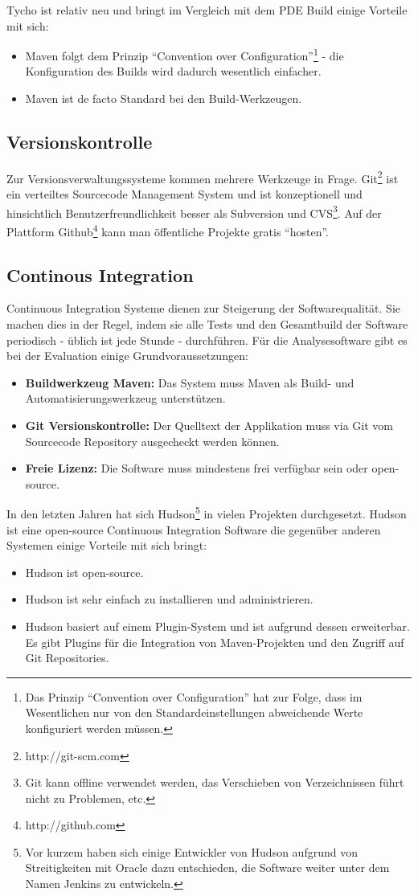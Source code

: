 Tycho ist relativ neu und bringt im Vergleich mit dem PDE Build einige Vorteile mit sich:
\begin{itemize}
	\item Maven folgt dem Prinzip ``Convention over Configuration''\footnote{Das Prinzip ``Convention over Configuration'' hat zur Folge, dass im Wesentlichen nur von den Standardeinstellungen abweichende Werte konfiguriert werden müssen.} - die Konfiguration des Builds wird dadurch wesentlich einfacher.
	\item Maven ist de facto Standard bei den Build-Werkzeugen.
\end{itemize}

\subsection{Versionskontrolle}
Zur Versionsverwaltungssysteme kommen mehrere Werkzeuge in Frage. Git\footnote{http://git-scm.com} ist ein verteiltes Sourcecode Management System und ist konzeptionell und hinsichtlich Benutzerfreundlichkeit besser als Subversion und CVS\footnote{Git kann offline verwendet werden, das Verschieben von Verzeichnissen führt nicht zu Problemen, etc.}. Auf der Plattform Github\footnote{http://github.com} kann man öffentliche Projekte gratis ``hosten''.


\subsection{Continous Integration}
Continuous Integration Systeme dienen zur Steigerung der Softwarequalität. Sie machen dies in der Regel, indem sie alle Tests und den Gesamtbuild der Software periodisch - üblich ist jede Stunde - durchführen. Für die Analysesoftware gibt es bei der Evaluation einige Grundvoraussetzungen:
\begin{itemize}
	\item \textbf{Buildwerkzeug Maven:} Das System muss Maven als Build- und Automatisierungswerkzeug unterstützen.
	\item \textbf{Git Versionskontrolle:} Der Quelltext der Applikation muss via Git vom Sourcecode Repository ausgecheckt werden können.
	\item \textbf{Freie Lizenz:} Die Software muss mindestens frei verfügbar sein oder open-source.
\end{itemize}
In den letzten Jahren hat sich Hudson\footnote{Vor kurzem haben sich einige Entwickler von Hudson aufgrund von Streitigkeiten mit Oracle dazu entschieden, die Software weiter unter dem Namen Jenkins zu entwickeln.} in vielen Projekten durchgesetzt. Hudson ist eine open-source Continuous Integration Software die gegenüber anderen Systemen einige Vorteile mit sich bringt:
\begin{itemize}
\item Hudson ist open-source.
\item Hudson ist sehr einfach zu installieren und administrieren.
\item Hudson basiert auf einem Plugin-System und ist aufgrund dessen erweiterbar. Es gibt Plugins für die Integration von Maven-Projekten und den Zugriff auf Git Repositories.
\end{itemize}



